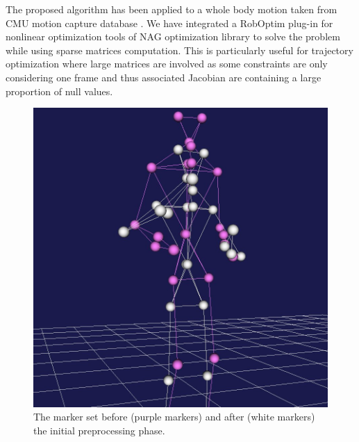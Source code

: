 \documentclass[letterpaper, 10 pt, conference]{ieeeconf}  %
\begin{document}
The proposed algorithm has been applied to a whole body motion
taken from CMU motion capture database \cite{CMUMotionDB}.
We have integrated a RobOptim plug-in for nonlinear optimization tools
of NAG  optimization library \cite{NAG}
to solve the problem while
using sparse matrices computation. This is particularly useful for
trajectory optimization where large matrices are involved as
some constraints are only considering one frame and thus associated
Jacobian are containing a large proportion of null values.
\begin{figure}[b]
  \begin{center}
    \includegraphics[width=0.7 \linewidth]{figure/retargeting-preprocessing.jpg}
    \end{center}
  \caption{The marker set before (purple markers) and after (white markers) the initial
    preprocessing phase.}
  \label{fig:preprocessing}
\end{figure}
\end{document}
